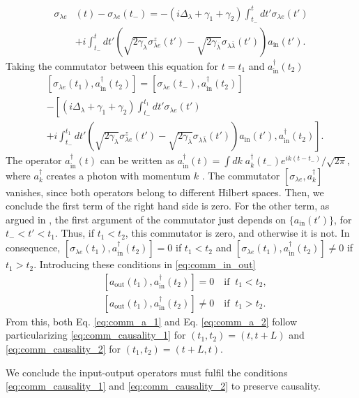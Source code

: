 \documentclass[aps,pra,reprint,amsmath,amssymb]{revtex4-1}
\begin{document}
\begin{align}
\label{eq:sigma_inout_int}
\sigma_{\lambda e}&(t)-\sigma_{\lambda e}(t_-)=-(i\Delta_\lambda+\gamma_1+\gamma_2)\int_{t_-}^t dt'\sigma_{\lambda e}(t')\nonumber\\
&+i\int_{t_-}^t dt' \left(\sqrt{2\gamma_\lambda}\sigma_{\lambda e}^z(t')- \sqrt{2\gamma_{\overline{\lambda}}}\sigma_{\lambda \overline{\lambda}}(t')\right)a_\text{in}(t').
\end{align}
Taking the commutator between this equation for $t=t_1$ and $a_\text{in}^\dagger(t_2)$
\begin{align}
&[\sigma_{\lambda e}(t_1),a_\text{in}^\dagger(t_2)]=[\sigma_{\lambda e}(t_-),a_\text{in}^\dagger(t_2)]\nonumber\\
&-\left[(i\Delta_\lambda+\gamma_1+\gamma_2)\int_{t_-}^{t_1} dt'\sigma_{\lambda e}(t') \right.\nonumber\\
&\left.+i\int_{t_-}^{t_1} dt' \left(\sqrt{2\gamma_\lambda}\sigma_{\lambda e}^z(t')- \sqrt{2\gamma_{\overline{\lambda}}}\sigma_{\lambda \overline{\lambda}}(t')\right)a_\text{in}(t'),a_\text{in}^\dagger(t_2)\right].
\end{align}
The operator $a_\text{in}^\dagger(t)$ can be written as $a_\text{in}^\dagger(t)=\int dk\; a_k^\dagger (t_-)e^{ik(t-t_-)}/\sqrt{2\pi}$, where $a_k^\dagger$ creates a photon with momentum $k$ \cite{Fan2010}. The commutator $[\sigma_{\lambda e},a_k^\dagger]$ vanishes, since both operators belong to different Hilbert spaces. Then, we conclude the first term of the right hand side is zero. For the other term, as argued in \cite{Xu2015}, the first argument of the commutator just depends on $\{a_\text{in}(t')\}$, for $t_-<t'<t_1$. Thus, if $t_1<t_2$, this commutator is zero, and otherwise it is not. In consequence, $[\sigma_{\lambda e}(t_1),a_\text{in}^\dagger(t_2)]=0$ if $t_1<t_2$ and $[\sigma_{\lambda e}(t_1),a_\text{in}^\dagger(t_2)]\neq 0$ if $t_1>t_2$. Introducing these conditions in \eqref{eq:comm_in_out}
\begin{align}
\label{eq:comm_causality_1}&[a_\text{out}(t_1),a_\text{in}^\dagger(t_2)]=0\quad \text{if}\;\; t_1<t_2,\\
\label{eq:comm_causality_2}&[a_\text{out}(t_1),a_\text{in}^\dagger(t_2)]\neq 0\quad \text{if}\;\; t_1>t_2.
\end{align}
From this, both Eq. \eqref{eq:comm_a_1} and Eq. \eqref{eq:comm_a_2} follow particularizing \eqref{eq:comm_causality_1} for $(t_1,t_2)=(t,t+L)$ and \eqref{eq:comm_causality_2} for $(t_1,t_2)=(t+L,t)$.

We conclude the input-output operators must fulfil the conditions \eqref{eq:comm_causality_1} and \eqref{eq:comm_causality_2} to preserve causality.%
\end{document}
